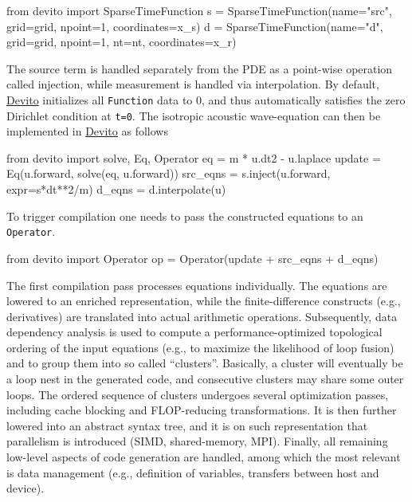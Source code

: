\documentclass[10pt, conference]{IEEEtran}
\newcommand{\devito}{\href{https://github.com/devitocodes/devito}{Devito} }
\begin{document}
\begin{python}[label=sparse, caption=SparseFunction definition]
from devito import SparseTimeFunction
s = SparseTimeFunction(name="src",
                       grid=grid, npoint=1,
                       coordinates=x_s)
d = SparseTimeFunction(name="d", grid=grid,
                       npoint=1, nt=nt,
                       coordinates=x_r)
\end{python}

The source term is handled separately from the PDE as a point-wise
operation called injection, while measurement is handled via
interpolation. By default, \devito initializes all \texttt{Function} data
to 0, and thus automatically satisfies the zero Dirichlet condition at
\texttt{t=0}. The isotropic acoustic wave-equation can then be implemented
in \devito as follows

\begin{python}[label=WE, caption=Wave-equation symbolic definition]
from devito import solve, Eq, Operator
eq = m * u.dt2 - u.laplace
update = Eq(u.forward, solve(eq, u.forward))
src_eqns = s.inject(u.forward, expr=s*dt**2/m)
d_eqns = d.interpolate(u)
\end{python}

To trigger compilation one needs to pass the constructed equations to an
\texttt{Operator}.

\begin{python}[label=op, caption=Operator creation]
from devito import Operator
op = Operator(update + src_eqns + d_eqns)
\end{python}

The first compilation pass processes equations individually. The
equations are lowered to an enriched representation, while the
finite-difference constructs (e.g., derivatives) are translated into
actual arithmetic operations. Subsequently, data dependency analysis is
used to compute a performance-optimized topological ordering of the
input equations (e.g., to maximize the likelihood of loop fusion) and to
group them into so called ``clusters''. Basically, a cluster will
eventually be a loop nest in the generated code, and consecutive
clusters may share some outer loops. The ordered sequence of clusters
undergoes several optimization passes, including cache blocking and
FLOP-reducing transformations. It is then further lowered into an
abstract syntax tree, and it is on such representation that parallelism
is introduced (SIMD, shared-memory, MPI). Finally, all remaining
low-level aspects of code generation are handled, among which the most
relevant is data management (e.g., definition of variables,
transfers between host and device).
\end{document}

